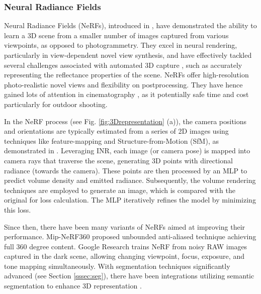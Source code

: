 \documentclass[11pt,a4paper]{article}
\begin{document}
\subsubsection{Neural Radiance Fields}
\label{sssec:nerf}

Neural Radiance Fields (NeRFs), introduced in \cite{Mildenhall:NeRF:2020}, have demonstrated the ability to learn a 3D scene from a smaller number of images captured from various viewpoints, as opposed to photogrammetry. They excel in neural rendering, particularly in view-dependent novel view synthesis, and have effectively tackled several challenges associated with automated 3D capture \cite{xie2022neural}, such as accurately representing the reflectance properties of the scene. NeRFs offer high-resolution photo-realistic novel views and flexibility on postprocessing. They have hence gained lots of attention in cinematography \cite{Azzarelli2024}, as it potentially safe time and cost particularly for outdoor shooting.

In the NeRF process (see Fig. \ref{fig:3Drepresentation} (a)), the camera positions and orientations are typically estimated from a series of 2D images using techniques like feature-mapping and Structure-from-Motion (SfM), as demonstrated in \cite{schoenberger:sfm:2016}. Leveraging INR, each image (or camera pose) is mapped into camera rays that traverse the scene, generating 3D points with directional radiance (towards the camera). These points are then processed by an MLP to predict volume density and emitted radiance. Subsequently, the volume rendering techniques are employed to generate an image, which is compared with the original for loss calculation. The MLP iteratively refines the model by minimizing this loss.

Since then, there have been many variants of NeRFs aimed at improving their performance. Mip-NeRF360 \cite{Barron:Mip-NeRF360:2022} proposed unbounded anti-aliased technique achieving full 360 degree content. Google Research
\cite{Mildenhall:NeRFDark:2022} trains NeRF from noisy RAW images captured in the dark scene, allowing changing viewpoint, focus, exposure, and tone mapping simultaneously. With segmentation techniques significantly advanced (see Section \ref{sssec:seg}), there have been integrations utilizing semantic segmentation to enhance 3D representation \cite{Guo:neural:2022}.
\end{document}
